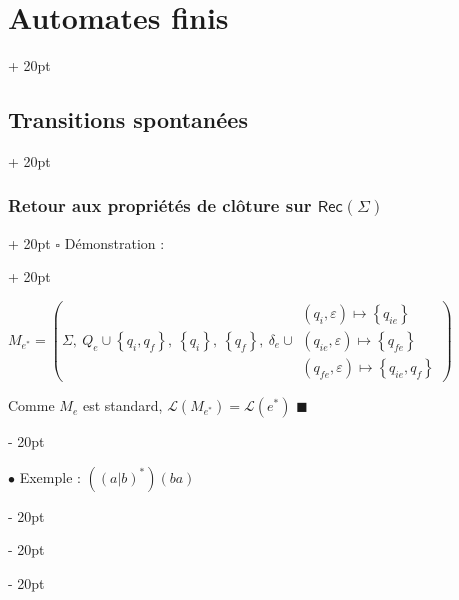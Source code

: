 \documentclass[a4paper, 12pt, twoside]{article}
\newcommand{\lr}[1]{\left( #1 \right)}
\newcommand{\set}[1]{\left\{ #1 \right\}}
\newcommand{\ind}[1][20pt]{\advance\leftskip + #1}
\newcommand{\deind}[1][20pt]{\advance\leftskip - #1}
\newenvironment{indt}[2][20pt]{#2 \par \ind[#1]}{\par \deind} %
\newenvironment{proof}[1][{Démonstration :}]{\begin{indt}{$\square$ #1}}{$\blacksquare$ \end{indt}}
\newcommand{\Rec}[1]{\mathsf{Rec}\!\lr{#1}}
\begin{document}
\begin{indt}{\section{Automates finis}}
\begin{indt}{\subsection{Transitions spontanées}}
\begin{indt}{\subsubsection{Retour aux propriétés de clôture sur $\Rec \Sigma$}}
\begin{proof}
\begin{center}
                    \end{center}

                    $
                        M_{e^*} =
                        \lr{
                            \Sigma,\
                            Q_e \cup \set{q_i, q_f},\
                            \set{q_i},\
                            \set{q_f},\
                            \delta_e \cup
                            \begin{array}{|l}
                                (q_i, \varepsilon) \longmapsto \set{q_{ie}}
                                \\
                                (q_{ie}, \varepsilon) \longmapsto \set{q_{fe}}
                                \\
                                (q_{fe}, \varepsilon) \longmapsto \set{q_{ie}, q_{f}}
                            \end{array}
                        }
                    $

                    \vspace{12pt}
                    
                     Comme $M_e$ est standard, $\mathcal L(M_{e^*}) = \mathcal L(e^*)$
                \end{proof}

                \vspace{12pt}
                
                $\bullet$ Exemple : $((a | b)^*)(ba)$


\end{indt}
\end{indt}
\end{indt}
\end{document}
